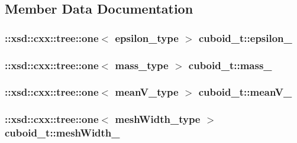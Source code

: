 \subsection{Member Data Documentation}
\hypertarget{classcuboid__t_a89f568a5a27be873e0f482d708e31e3d}{
\subsubsection[{epsilon\-\_\-}]{\setlength{\rightskip}{0pt plus 5cm}\-::xsd\-::cxx\-::tree\-::one$<$ {\bf epsilon\-\_\-type} $>$ cuboid\-\_\-t\-::epsilon\-\_\-\hspace{0.3cm}{\ttfamily [protected]}}}\label{classcuboid__t_a89f568a5a27be873e0f482d708e31e3d}
\hypertarget{classcuboid__t_a9c7dd176b3732eb61362f104fe51e4b8}{
\subsubsection[{mass\-\_\-}]{\setlength{\rightskip}{0pt plus 5cm}\-::xsd\-::cxx\-::tree\-::one$<$ {\bf mass\-\_\-type} $>$ cuboid\-\_\-t\-::mass\-\_\-\hspace{0.3cm}{\ttfamily [protected]}}}\label{classcuboid__t_a9c7dd176b3732eb61362f104fe51e4b8}
\hypertarget{classcuboid__t_a3d83a46d242a523fb10095e9025abddf}{
\subsubsection[{mean\-V\-\_\-}]{\setlength{\rightskip}{0pt plus 5cm}\-::xsd\-::cxx\-::tree\-::one$<$ {\bf mean\-V\-\_\-type} $>$ cuboid\-\_\-t\-::mean\-V\-\_\-\hspace{0.3cm}{\ttfamily [protected]}}}\label{classcuboid__t_a3d83a46d242a523fb10095e9025abddf}
\hypertarget{classcuboid__t_af31779bcbd1ff3844623c658f633a8aa}{
\subsubsection[{mesh\-Width\-\_\-}]{\setlength{\rightskip}{0pt plus 5cm}\-::xsd\-::cxx\-::tree\-::one$<$ {\bf mesh\-Width\-\_\-type} $>$ cuboid\-\_\-t\-::mesh\-Width\-\_\-\hspace{0.3cm}{\ttfamily [protected]}}}\label{classcuboid__t_af31779bcbd1ff3844623c658f633a8aa}
